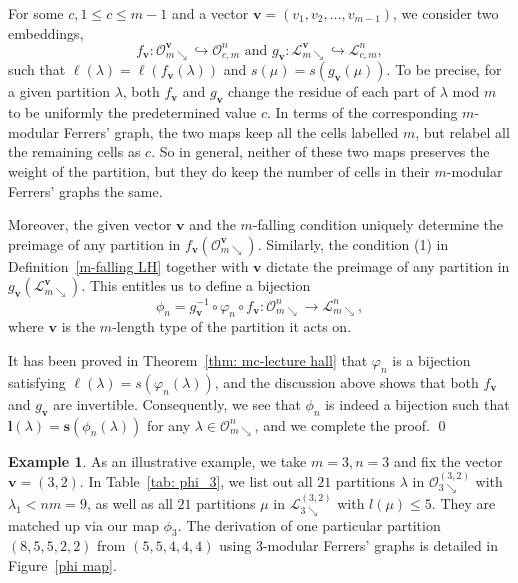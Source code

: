 \documentclass[11pt,reqno]{amsart}
\numberwithin{equation}{section}
\theoremstyle{plain}
\theoremstyle{definition}
\newtheorem{example}[theorem]{Example}
\newcommand{\OO}{\mathcal{O}}
\newcommand{\sbf}{\mathbf{s}}
\newcommand{\lbf}{\mathbf{l}}
\newcommand{\vbf}{\mathbf{v}}
\newcommand{\LL}{\mathcal{L}}
\begin{document}
For some $c, 1\le c \le m-1$ and a vector $\vbf=(v_1,v_2,\ldots,v_{m-1})$, we consider two embeddings,
$$f_{\vbf}:\OO_{m\searrow}^{\vbf}\hookrightarrow\OO_{c,m}^n \text{ and } g_{\vbf}:\LL_{m\searrow}^{\vbf}\hookrightarrow\LL_{c,m}^n,$$
such that $\ell(\lambda)=\ell(f_{\vbf}(\lambda))$ and $s(\mu)=s(g_{\vbf}(\mu))$. To be precise, for a given partition $\lambda$, both $f_{\vbf}$ and $g_{\vbf}$ change the residue of each part of $\lambda$ mod $m$ to be uniformly the predetermined value $c$. In terms of the corresponding $m$-modular Ferrers' graph, the two maps keep all the cells labelled $m$, but relabel all the remaining cells as $c$. So in general, neither of these two maps preserves the weight of the partition, but they do keep the number of cells in their $m$-modular Ferrers' graphs the same.

Moreover, the given vector $\vbf$ and the $m$-falling condition uniquely determine the preimage of any partition in $f_{\vbf}(\OO_{m\searrow}^{\vbf})$. Similarly, the condition (1) in Definition~\ref{m-falling LH} together with $\vbf$ dictate the preimage of any partition in $g_{\vbf}(\LL_{m\searrow}^{\vbf})$. This entitles us to define a bijection $$\phi_n=g_{\vbf}^{-1}\circ\varphi_n\circ f_{\vbf}: \OO_{m\searrow}^n\longrightarrow \LL_{m\searrow}^n,$$
where $\vbf$ is the $m$-length type of the partition it acts on.

It has been proved in Theorem~\ref{thm: mc-lecture hall} that $\varphi_n$ is a bijection satisfying $\ell(\lambda)=s(\varphi_n(\lambda))$, and the discussion above shows that both $f_{\vbf}$ and $g_{\vbf}$ are invertible. Consequently, we see that $\phi_n$ is indeed a bijection such that $\lbf(\lambda)=\sbf(\phi_n(\lambda))$ for any $\lambda\in\OO_{m\searrow}^n$, and we complete the proof. \hfill \qed


\begin{example}
As an illustrative example, we take $m=3,n=3$ and fix the vector $\vbf=(3,2)$. In Table~\ref{tab: phi_3}, we list out all $21$ partitions $\lambda$ in $\OO_{3\searrow}^{(3,2)}$ with $\lambda_1<nm=9$, as well as all $21$ partitions $\mu$ in $\LL_{3\searrow}^{(3,2)}$ with $l(\mu)\le 5$. They are matched up via our map $\phi_3$. The derivation of one particular partition $(8,5,5,2,2)$ from $(5,5,4,4,4)$ using $3$-modular Ferrers' graphs is detailed in Figure~\ref{phi map}.
\end{example}
\end{document}
